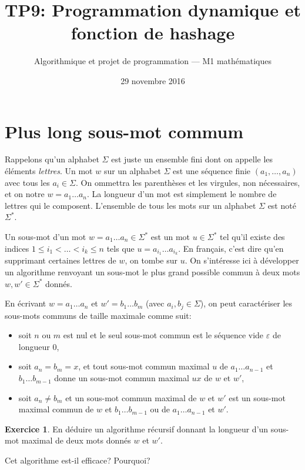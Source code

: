 \documentclass[french,a4paper]{article}
\title{\sffamily TP9: Programmation dynamique et fonction de hashage}%
\date{29 novembre 2016}%
\author{Algorithmique et projet de programmation --- M1
  mathématiques}%
\theoremstyle{definition}
\newtheorem{exercise}{Exercice}
\theoremstyle{remark}
\begin{document}
\maketitle

\section{Plus long sous-mot commum}
\label{sec:lcs}

Rappelons qu'un alphabet $\Sigma$ est juste un ensemble fini dont on
appelle les éléments {\em lettres}. Un mot $w$ sur un alphabet
$\Sigma$ est une séquence finie $(a_1,\dots,a_n)$ avec tous les
$a_i \in \Sigma$. On ommettra les parenthèses et les virgules, non
nécessaires, et on notre $w = a_1\dots a_n$. La longueur d'un mot est
simplement le nombre de lettres qui le composent. L'ensemble de tous
les mots sur un alphabet $\Sigma$ est noté $\Sigma^\ast$.

Un sous-mot d'un mot $w = a_1\dots a_n \in \Sigma^\ast$ est un mot
$u \in \Sigma^\ast$ tel qu'il existe des indices
$1\leq i_1<\dots<i_k \leq n$ tels que $u = a_{i_1} \dots a_{i_k}$. En
français, c'est dire qu'en supprimant certaines lettres de $w$, on
tombe sur $u$. On s'intéresse ici à développer un algorithme renvoyant
un sous-mot le plus grand possible commun à deux mots
$w,w' \in \Sigma^\ast$ donnés.

En écrivant $w = a_1 \dots a_n$ et $w' = b_1 \dots b_m$ (avec
$a_i,b_j \in \Sigma$), on peut caractériser les sous-mots communs de
taille maximale comme suit:
\begin{itemize}
\item soit $n$ ou $m$ est nul et le seul sous-mot commun est le
  séquence vide $\varepsilon$ de longueur $0$,
\item soit $a_n = b_m = x$, et tout sous-mot commun maximal $u$ de
  $a_1\dots a_{n-1}$ et $b_1\dots b_{m-1}$ donne un sous-mot commun
  maximal $ux$ de $w$ et $w'$,
\item soit $a_n\neq b_m$ et un sous-mot commun maximal de $w$ et $w'$
  est un sous-mot maximal commun de $w$ et $b_1\dots b_{m-1}$ ou de
  $a_1\dots a_{n-1}$ et $w'$.
\end{itemize}

\begin{exercise}
  En déduire un algorithme récursif donnant la longueur d'un sous-mot
  maximal de deux mots donnés $w$ et $w'$.

  Cet algorithme est-il efficace? Pourquoi?
\end{exercise}
\end{document}
